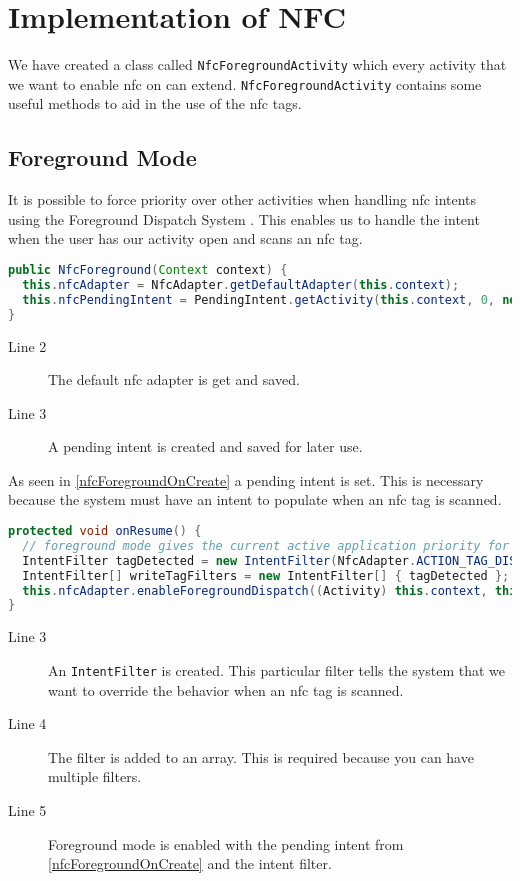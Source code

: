 \section{Implementation of NFC}
We have created a class called \lstinline|NfcForegroundActivity| which every activity that we want to enable \ac{nfc} on can extend. \lstinline|NfcForegroundActivity| contains some useful methods to aid in the use of the \ac{nfc} tags.

\subsection{Foreground Mode}
\label{sec:foeground}

It is possible to force priority over other activities when handling \ac{nfc} intents using the Foreground Dispatch System \citep{foregroundDispatch}. This enables us to handle the intent when the user has our activity open and scans an \ac{nfc} tag.

\begin{lstlisting}[language=java, label=nfcForegroundOnCreate, caption=OnCreate]
public NfcForeground(Context context) { 
  this.nfcAdapter = NfcAdapter.getDefaultAdapter(this.context);
  this.nfcPendingIntent = PendingIntent.getActivity(this.context, 0, new Intent(this.context, ((Activity) this.context).getClass()).addFlags(Intent.FLAG_ACTIVITY_SINGLE_TOP), 0);
}
\end{lstlisting}
\begin{description}
\item[Line 2] The default \ac{nfc} adapter is get and saved.
\item[Line 3] A pending intent is created and saved for later use.
\end{description}
As seen in \autoref{nfcForegroundOnCreate} a pending intent is set. This is necessary because the system must have an intent to populate when an \ac{nfc} tag is scanned.

\begin{lstlisting}[language=java, caption=Foreground mode enabling]
protected void onResume() {
  // foreground mode gives the current active application priority for reading scanned tags
  IntentFilter tagDetected = new IntentFilter(NfcAdapter.ACTION_TAG_DISCOVERED); // filter for tags
  IntentFilter[] writeTagFilters = new IntentFilter[] { tagDetected };
  this.nfcAdapter.enableForegroundDispatch((Activity) this.context, this.nfcPendingIntent, writeTagFilters, null);
}
\end{lstlisting}
\begin{description}
\item[Line 3] An \lstinline|IntentFilter| is created. This particular filter tells the system that we want to override the behavior when an \ac{nfc} tag is scanned.
\item[Line 4] The filter is added to an array. This is required because you can have multiple filters.
\item[Line 5] Foreground mode is enabled with the pending intent from \autoref{nfcForegroundOnCreate} and the intent filter.
\end{description}

